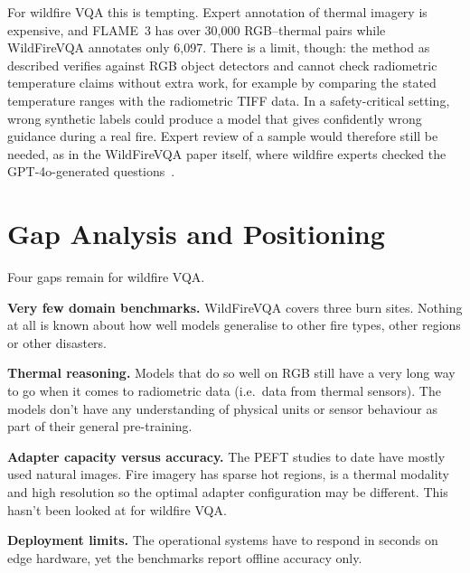 \documentclass[12pt]{report}
\begin{document}
For wildfire VQA this is tempting. Expert annotation of thermal imagery is expensive, and FLAME~3 has over 30{,}000 RGB--thermal pairs while WildFireVQA annotates only 6{,}097. There is a limit, though: the method as described verifies against RGB object detectors and cannot check radiometric temperature claims without extra work, for example by comparing the stated temperature ranges with the radiometric TIFF data. In a safety-critical setting, wrong synthetic labels could produce a model that gives confidently wrong guidance during a real fire. Expert review of a sample would therefore still be needed, as in the WildFireVQA paper itself, where wildfire experts checked the GPT-4o-generated questions~\cite{wildfirevqa}.

\section{Gap Analysis and Positioning}
Four gaps remain for wildfire VQA.

\textbf{Very few domain benchmarks.} WildFireVQA covers three burn sites. Nothing at all is known about how well models generalise to other fire types, other regions or other disasters.

\textbf{Thermal reasoning.} Models that do so well on RGB still have a very long way to go when it comes to radiometric data (i.e.\ data from thermal sensors). The models don't have any understanding of physical units or sensor behaviour as part of their general pre-training.

\textbf{Adapter capacity versus accuracy.} The PEFT studies to date have mostly used natural images. Fire imagery has sparse hot regions, is a thermal modality and high resolution so the optimal adapter configuration may be different. This hasn't been looked at for wildfire VQA.

\textbf{Deployment limits.} The operational systems have to respond in seconds on edge hardware, yet the benchmarks report offline accuracy only.
\end{document}
